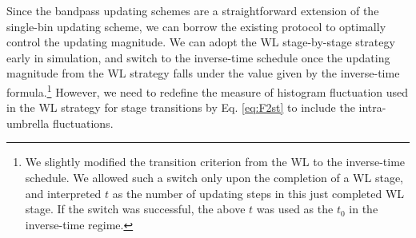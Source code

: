\documentclass[reprint, superscriptaddress, floatfix]{revtex4-1}
\begin{document}
Since the bandpass updating schemes are a straightforward extension
of the single-bin updating scheme,
we can borrow the existing protocol\cite{belardinelli2007,
  *belardinelli2007jcp, *belardinelli2008, *belardinelli2016}
to optimally control the updating magnitude.
%
We can adopt the WL stage-by-stage strategy early in simulation,
and switch to the inverse-time schedule
once the updating magnitude from the WL strategy
falls under the value given by the inverse-time formula.\footnote{We
  slightly modified the transition criterion
  from the WL to the inverse-time schedule.
  We allowed such a switch only
  upon the completion of a WL stage,
  and interpreted $t$ as the number of updating steps
  in this just completed WL stage.
  If the switch was successful,
  the above $t$ was used as the $t_0$
  in the inverse-time regime.}
However, we need to redefine the measure of histogram fluctuation
used in the WL strategy for stage transitions
by Eq. \eqref{eq:F2st}
to include the intra-umbrella fluctuations.
%
\end{document}
